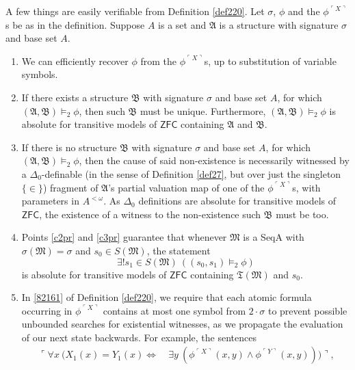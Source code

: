 \documentclass[12pt, twoside]{memoir}
\numberwithin{equation}{section}
\theoremstyle{definition}
\theoremstyle{remark}
\theoremstyle{definition}
\theoremstyle{definition}
\theoremstyle{definition}
\theoremstyle{remark}
\begin{document}
A few things are easily verifiable from Definition \ref{def220}. Let $\sigma$, $\phi$ and the $\phi^{\ulcorner X \urcorner}$s be as in the definition. Suppose $A$ is a set and $\mathfrak{A}$ is a structure with signature $\sigma$ and base set $A$.
\begin{enumerate}[label=(C\arabic*)]
    \item We can efficiently recover $\phi$ from the $\phi^{\ulcorner X \urcorner}$s, up to substitution of variable symbols.
    \item\label{c2pr} If there exists a structure $\mathfrak{B}$ with signature $\sigma$ and base set $A$, for which $(\mathfrak{A}, \mathfrak{B}) \models_2 \phi$, then such $\mathfrak{B}$ must be unique. Furthermore, $(\mathfrak{A}, \mathfrak{B}) \models_2 \phi$ is absolute for transitive models of $\mathsf{ZFC}$ containing $\mathfrak{A}$ and $\mathfrak{B}$.
    \item\label{c3pr} If there is no structure $\mathfrak{B}$ with signature $\sigma$ and base set $A$, for which $(\mathfrak{A}, \mathfrak{B}) \models_2 \phi$, then the cause of said non-existence is necessarily witnessed by a $\Delta_0$-definable (in the sense of Definition \ref{def27}, but over just the singleton $\{\in\}$) fragment of $\mathfrak{A}$'s partial valuation map of one of the $\phi^{\ulcorner X \urcorner}$s, with parameters in $A^{< \omega}$. As $\Delta_0$ definitions are absolute for transitive models of $\mathsf{ZFC}$, the existence of a witness to the non-existence such $\mathfrak{B}$ must be too.
    \item\label{c4pr} Points \ref{c2pr} and \ref{c3pr} guarantee that whenever $\mathfrak{M}$ is a SeqA with $\sigma(\mathfrak{M}) = \sigma$ and $s_0 \in S(\mathfrak{M})$, the statement
    \begin{equation*}
        \exists ! s_1 \in S(\mathfrak{M}) \ ((s_0, s_1) \models_2 \phi)
    \end{equation*}
    is absolute for transitive models of $\mathsf{ZFC}$ containing $\mathfrak{T}(\mathfrak{M})$ and $s_0$.
    \item In \ref{82161} of Definition \ref{def220}, we require that each atomic formula occurring in $\phi^{\ulcorner X \urcorner}$ contains at most one symbol from $2 \cdot \sigma$ to prevent possible unbounded searches for existential witnesses, as we propagate the evaluation of our next state backwards. For example, the sentences 
    \begin{align*}
        \ulcorner \forall x \ (X_1(x) = Y_1(x) \iff & \ \exists y \ (\phi^{\ulcorner X \urcorner}(x, y) \wedge \phi^{\ulcorner Y \urcorner}(x, y))) \urcorner \text{,} \\

\end{align*}
\end{enumerate}
\end{document}
